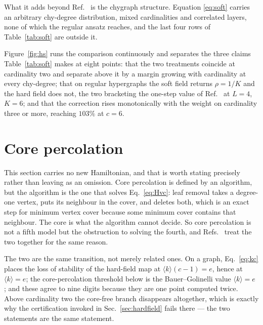 \documentclass[aps,pre,twocolumn,superscriptaddress,floatfix]{revtex4-2}
\newcommand{\ave}[1]{\langle #1 \rangle}
\begin{document}
What it adds beyond Ref.~\cite{MT07} is the chygraph structure. Equation
\eqref{eq:soft} carries an arbitrary chy-degree distribution, mixed
cardinalities and correlated layers, none of which the regular ansatz reaches,
and the last four rows of Table~\ref{tab:soft} are outside it.

Figure~\ref{fig:hs} runs the comparison continuously and separates the three
claims Table~\ref{tab:soft} makes at eight points: that the two treatments
coincide at cardinality two and separate above it by a margin growing with
cardinality at every chy-degree; that on regular hypergraphs the soft field
returns $\rho=1/K$ and the hard field does not, the two bracketing the one-step
value of Ref.~\cite{MT07} at $L=4$, $K=6$; and that the correction rises
monotonically with the weight on cardinality three or more, reaching $103\%$ at
$c=6$.

\section{Core percolation}
\label{sec:core}

This section carries no new Hamiltonian, and that is worth stating precisely
rather than leaving as an omission. Core percolation is defined by an algorithm,
but the algorithm is the one that solves Eq.~\eqref{eq:Hvc}: leaf removal takes
a degree-one vertex, puts its neighbour in the cover, and deletes both, which is
an exact step for minimum vertex cover because some minimum cover contains that
neighbour. The core is what the algorithm cannot decide. So core percolation is
not a fifth model but the obstruction to solving the fourth, and
Refs.~\cite{Liu12,Cou20} treat the two together for the same reason.

The two are the same transition, not merely related ones. On a graph,
Eq.~\eqref{eq:kc} places the loss of stability of the hard-field map at
$\ave{k}(c-1)=e$, hence at $\ave{k}=e$; the core-percolation threshold below is
the Bauer--Golinelli value $\ave{k}=e$ \cite{BG01}; and these agree to nine
digits because they are one point computed twice. Above cardinality two the
core-free branch disappears altogether, which is exactly why the certification
invoked in Sec.~\ref{sec:hardfield} fails there --- the two statements are the
same statement.
\end{document}
